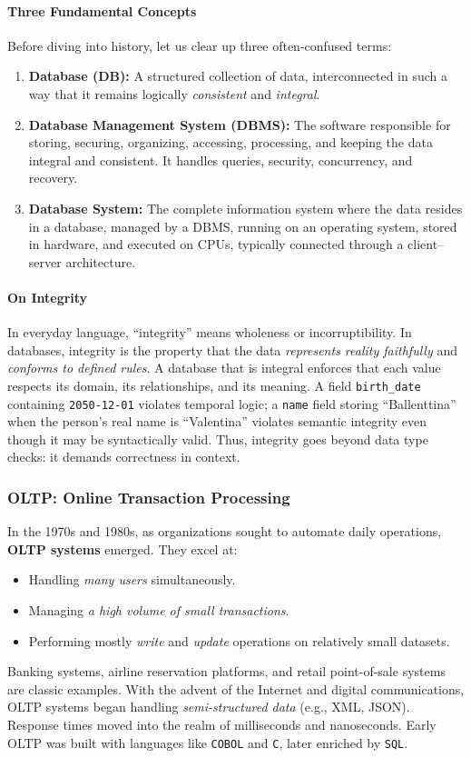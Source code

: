 \documentclass[12pt,a4paper]{article}
\begin{document}
\paragraph{Three Fundamental Concepts}
Before diving into history, let us clear up three often-confused terms:
\begin{enumerate}
    \item \textbf{Database (DB):} A structured collection of data, interconnected in such a way that it remains logically \emph{consistent} and \emph{integral}.
    \item \textbf{Database Management System (DBMS):} The software responsible for storing, securing, organizing, accessing, processing, and keeping the data integral and consistent. It handles queries, security, concurrency, and recovery.
    \item \textbf{Database System:} The complete information system where the data resides in a database, managed by a DBMS, running on an operating system, stored in hardware, and executed on CPUs, typically connected through a client–server architecture.
\end{enumerate}

\paragraph{On Integrity}
In everyday language, ``integrity'' means wholeness or incorruptibility.  
In databases, integrity is the property that the data \emph{represents reality faithfully} and \emph{conforms to defined rules}.  
A database that is integral enforces that each value respects its domain, its relationships, and its meaning.  
A field \texttt{birth\_date} containing \texttt{2050-12-01} violates temporal logic;  
a \texttt{name} field storing ``Ballenttina'' when the person’s real name is ``Valentina'' violates semantic integrity even though it may be syntactically valid.  
Thus, integrity goes beyond data type checks: it demands correctness in context.

\subsubsection{OLTP: Online Transaction Processing}
In the 1970s and 1980s, as organizations sought to automate daily operations, \textbf{OLTP systems} emerged.  
They excel at:
\begin{itemize}
    \item Handling \emph{many users} simultaneously.
    \item Managing \emph{a high volume of small transactions}.
    \item Performing mostly \emph{write} and \emph{update} operations on relatively small datasets.
\end{itemize}
Banking systems, airline reservation platforms, and retail point-of-sale systems are classic examples.  
With the advent of the Internet and digital communications, OLTP systems began handling \emph{semi-structured data} (e.g., XML, JSON).  
Response times moved into the realm of milliseconds and nanoseconds.  
Early OLTP was built with languages like \texttt{COBOL} and \texttt{C}, later enriched by \texttt{SQL}.
\end{document}
